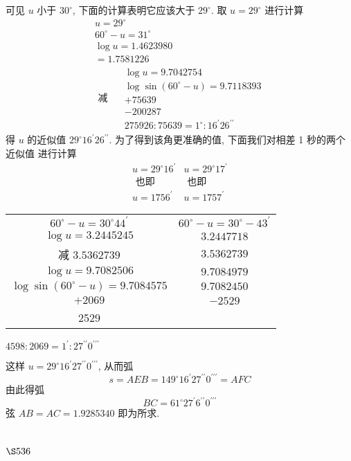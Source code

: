 可见 $u$ 小于 $30^{\circ}$, 下面的计算表明它应该大于 $29^{\circ}$. 取 $u=29^{\circ}$ 进行计算
\[
\begin{gathered}
u=29^{\circ} \\
60^{\circ}-u=31^{\circ} \\
\log u=1.4623980 \\
=1.7581226 \\
\text { 减 } \quad \begin{array}{c}
\log u=9.7042754 \\
\log \sin \left(60^{\circ}-u\right)=9.7118393 \\
+75639 \\
-200287 \\
275926: 75639=1^{\circ}: 16^{\prime} 26^{\prime \prime}
\end{array}
\end{gathered}
\]
得 $u$ 的近似值 $29^{\circ} 16^{\prime} 26^{\prime \prime}$. 为了得到该角更准确的值, 下面我们对相差 1 秒的两个近似值 进行计算
\[
\begin{array}{cc}
u=29^{\circ} 16^{\prime} & u=29^{\circ} 17^{\prime} \\
\text { 也即 } & \text { 也即 } \\
u=1756^{\prime} & u=1757^{\prime}
\end{array}
\]
\begin{tabular}{cc}
$60^{\circ}-u=30^{\circ} 44^{\prime}$ & $60^{\circ}-u=30^{\circ}-43^{\prime}$ \\
$\log u=3.2445245$ & $3.2447718$ \\
减 $3.5362739$ & $3.5362739$ \\
\hline $\log u=9.7082506$ & $9.7084979$ \\
$\log \sin \left(60^{\circ}-u\right)=9.7084575$ & $9.7082450$ \\
\hline$+2069$ & $-2529$ \\
2529 &
\end{tabular}

$4598: 2069=1^{\prime}: 27^{\prime \prime} 0^{\prime \prime \prime}$

这样 $u=29^{\circ} 16^{\prime} 27^{\prime \prime} 0^{\prime \prime \prime}$, 从而弧
\[
s=A E B=149^{\circ} 16^{\prime} 27^{\prime \prime} 0^{\prime \prime \prime}=A F C
\]
由此得弧
\[
B C=61^{\circ} 27^{\prime} 6^{\prime \prime} 0^{\prime \prime \prime}
\]
弦 $A B=A C=1.9285340$ 即为所求.

\section{$\S 536$}

